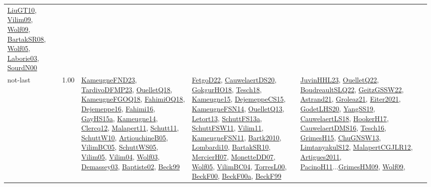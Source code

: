 {\begin{longtable}{p{3cm}r>{\raggedright\arraybackslash}p{6cm}>{\raggedright\arraybackslash}p{6cm}>{\raggedright\arraybackslash}p{8cm}}
\hyperref[detail:LiuGT10]{LiuGT10}, \hyperref[detail:Vilim09]{Vilim09}, \hyperref[detail:Wolf09]{Wolf09}, \hyperref[detail:BartakSR08]{BartakSR08}, \hyperref[detail:Wolf05]{Wolf05}, \hyperref[detail:Laborie03]{Laborie03}, \hyperref[detail:SourdN00]{SourdN00}\\
\index{not-last}\index{Algorithms!not-last}not-last &  1.00 & \hyperref[detail:KameugneFND23]{KameugneFND23}, \hyperref[detail:TardivoDFMP23]{TardivoDFMP23}, \hyperref[detail:OuelletQ18]{OuelletQ18}, \hyperref[detail:KameugneFGOQ18]{KameugneFGOQ18}, \hyperref[detail:FahimiOQ18]{FahimiOQ18}, \hyperref[detail:Dejemeppe16]{Dejemeppe16}, \hyperref[detail:Fahimi16]{Fahimi16}, \hyperref[detail:GayHS15a]{GayHS15a}, \hyperref[detail:Kameugne14]{Kameugne14}, \hyperref[detail:Clercq12]{Clercq12}, \hyperref[detail:Malapert11]{Malapert11}, \hyperref[detail:Schutt11]{Schutt11}, \hyperref[detail:SchuttW10]{SchuttW10}, \hyperref[detail:ArtiouchineB05]{ArtiouchineB05}, \hyperref[detail:VilimBC05]{VilimBC05}, \hyperref[detail:SchuttWS05]{SchuttWS05}, \hyperref[detail:Vilim05]{Vilim05}, \hyperref[detail:Vilim04]{Vilim04}, \hyperref[detail:Wolf03]{Wolf03}, \hyperref[detail:Demassey03]{Demassey03}, \hyperref[detail:Baptiste02]{Baptiste02}, \hyperref[detail:Beck99]{Beck99} & \hyperref[detail:FetgoD22]{FetgoD22}, \hyperref[detail:CauwelaertDS20]{CauwelaertDS20}, \hyperref[detail:GokgurHO18]{GokgurHO18}, \hyperref[detail:Tesch18]{Tesch18}, \hyperref[detail:Kameugne15]{Kameugne15}, \hyperref[detail:DejemeppeCS15]{DejemeppeCS15}, \hyperref[detail:KameugneFSN14]{KameugneFSN14}, \hyperref[detail:OuelletQ13]{OuelletQ13}, \hyperref[detail:Letort13]{Letort13}, \hyperref[detail:SchuttFS13a]{SchuttFS13a}, \hyperref[detail:SchuttFSW11]{SchuttFSW11}, \hyperref[detail:Vilim11]{Vilim11}, \hyperref[detail:KameugneFSN11]{KameugneFSN11}, \hyperref[detail:Bartk2010]{Bartk2010}, \hyperref[detail:Lombardi10]{Lombardi10}, \hyperref[detail:BartakSR10]{BartakSR10}, \hyperref[detail:MercierH07]{MercierH07}, \hyperref[detail:MonetteDD07]{MonetteDD07}, \hyperref[detail:Wolf05]{Wolf05}, \hyperref[detail:VilimBC04]{VilimBC04}, \hyperref[detail:TorresL00]{TorresL00}, \hyperref[detail:BeckF00]{BeckF00}, \hyperref[detail:BeckF00a]{BeckF00a}, \hyperref[detail:BeckF99]{BeckF99} & \hyperref[detail:JuvinHHL23]{JuvinHHL23}, \hyperref[detail:OuelletQ22]{OuelletQ22}, \hyperref[detail:BoudreaultSLQ22]{BoudreaultSLQ22}, \hyperref[detail:GeitzGSSW22]{GeitzGSSW22}, \hyperref[detail:Astrand21]{Astrand21}, \hyperref[detail:Groleaz21]{Groleaz21}, \hyperref[detail:Eiter2021]{Eiter2021}, \hyperref[detail:GodetLHS20]{GodetLHS20}, \hyperref[detail:YangSS19]{YangSS19}, \hyperref[detail:CauwelaertLS18]{CauwelaertLS18}, \hyperref[detail:HookerH17]{HookerH17}, \hyperref[detail:CauwelaertDMS16]{CauwelaertDMS16}, \hyperref[detail:Tesch16]{Tesch16}, \hyperref[detail:GrimesH15]{GrimesH15}, \hyperref[detail:ChuGNSW13]{ChuGNSW13}, \hyperref[detail:LimtanyakulS12]{LimtanyakulS12}, \hyperref[detail:MalapertCGJLR12]{MalapertCGJLR12}, \hyperref[detail:Artigues2011]{Artigues2011}, \hyperref[detail:PacinoH11]{PacinoH11}...\hyperref[detail:GrimesHM09]{GrimesHM09}, \hyperref[detail:Wolf09]{Wolf09}, 
\end{longtable}}
